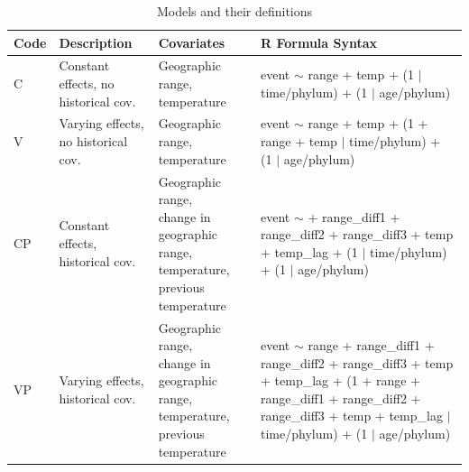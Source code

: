 \documentclass[12pt,letterpaper]{article}
\begin{document}
\begin{refsection}
\begin{table}[ht]
 \caption{Models and their definitions}
 \begin{threeparttable}
  {
   \def\arraystretch{1.5}
   \begin{tabular}{ l p{3cm} l l }
    Code & Description & Covariates & R Formula Syntax\tnote{a}\phantom{\textsuperscript{a}} \\
    \hline
    C & Constant effects, no historical cov. & \parbox[t]{0.25\textwidth}{Geographic range,\\temperature} & \parbox[t]{0.33\textwidth}{event $\sim$ range + temp +\\(1 $|$ time/phylum) +\\(1 $|$ age/phylum)} \\
    V & Varying effects, no historical cov. & \parbox[t]{0.25\textwidth}{Geographic range,\\temperature} & \parbox[t]{0.33\textwidth}{event $\sim$ range + temp +\\(1 + range + temp $|$ time/phylum) + (1 $|$ age/phylum)} \\ 
    CP & Constant effects, historical cov. & \parbox[t]{0.25\textwidth}{Geographic range,\\change in geographic range, temperature,\\previous temperature} & \parbox[t]{0.33\textwidth}{event $\sim$ + range\_diff1 + range\_diff2 + range\_diff3 + \\temp + temp\_lag +\\(1 $|$ time/phylum) +\\(1 $|$ age/phylum)} \\
    VP & Varying effects, historical cov. & \parbox[t]{0.25\textwidth}{Geographic range,\\change in geographic range, temperature,\\previous temperature} & \parbox[t]{0.33\textwidth}{event $\sim$ range + range\_diff1 + range\_diff2 + range\_diff3 + \\temp + temp\_lag +\\(1 + range + range\_diff1 + range\_diff2 + range\_diff3 +\\temp + temp\_lag $|$ time/phylum) +\\(1 $|$ age/phylum)} \\

\end{tabular}}
\end{threeparttable}
\end{table}
\end{refsection}
\end{document}
